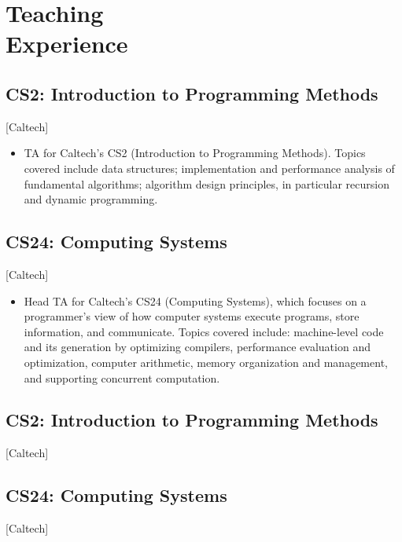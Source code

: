 \documentclass{mycv}
\begin{document}
\section{Teaching \\ Experience}

\subsection{CS2: Introduction to Programming Methods}[Caltech]
\begin{positions}
\end{positions}

\begin{itemize}
  \item TA for Caltech's CS2 (Introduction to Programming Methods). Topics covered include data structures; implementation and performance analysis of fundamental algorithms; algorithm design principles, in particular recursion and dynamic programming.
\end{itemize}

\subsection{CS24: Computing Systems}[Caltech]
\begin{positions}
\end{positions}

\begin{itemize}
  \item Head TA for Caltech’s CS24 (Computing Systems), which focuses on a programmer’s view of how computer systems execute programs, store information, and communicate. Topics covered include: machine-level code and its generation by optimizing compilers, performance evaluation and optimization, computer arithmetic, memory organization and management, and supporting concurrent computation.
\end{itemize}

\subsection{CS2: Introduction to Programming Methods}[Caltech]
\begin{positions}
\end{positions}

\subsection{CS24: Computing Systems}[Caltech]
\begin{positions}
\end{positions}
\end{document}
